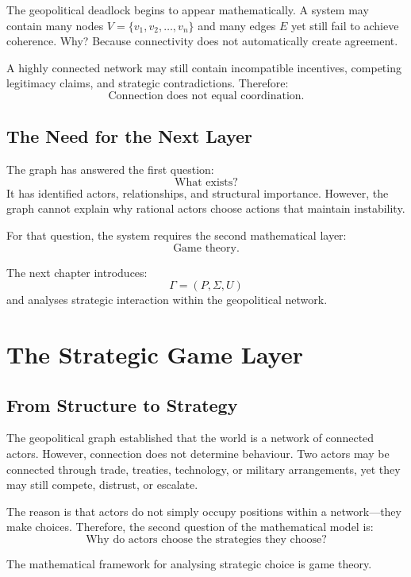 \documentclass[11pt,openany]{book}
\theoremstyle{plain}
\theoremstyle{definition}
\begin{document}
The geopolitical deadlock begins to appear mathematically. A system may contain many nodes \(V = \{v_1, v_2, \ldots, v_n\}\) and many edges \(E\) yet still fail to achieve coherence. Why? Because connectivity does not automatically create agreement.

A highly connected network may still contain incompatible incentives, competing legitimacy claims, and strategic contradictions. Therefore:
\[
\boxed{
\text{Connection does not equal coordination.}
}
\]

\section*{The Need for the Next Layer}

The graph has answered the first question:
\[
\boxed{
\text{What exists?}
}
\]
It has identified actors, relationships, and structural importance. However, the graph cannot explain why rational actors choose actions that maintain instability.

For that question, the system requires the second mathematical layer:
\[
\boxed{
\text{Game theory.}
}
\]

The next chapter introduces:
\[
\Gamma=(P,\Sigma,U)
\]
and analyses strategic interaction within the geopolitical network.

\chapter{The Strategic Game Layer}

\section*{From Structure to Strategy}

The geopolitical graph established that the world is a network of connected actors. However, connection does not determine behaviour. Two actors may be connected through trade, treaties, technology, or military arrangements, yet they may still compete, distrust, or escalate.

The reason is that actors do not simply occupy positions within a network—they make choices. Therefore, the second question of the mathematical model is:
\[
\boxed{
\text{Why do actors choose the strategies they choose?}
}
\]

The mathematical framework for analysing strategic choice is game theory.
\end{document}
